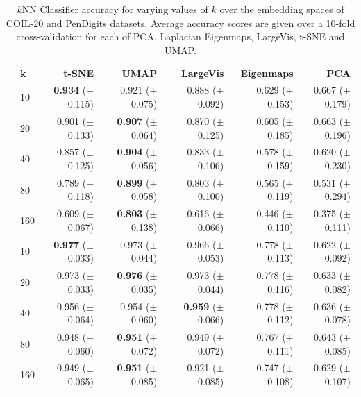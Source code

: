 \documentclass[12pt]{article}
\begin{document}
\begin{table}[!hptb]
\centering
\begin{tabular}{ll|rrrrr}
\toprule
\textbf{} & \textbf{k} & \textbf{t-SNE} & \textbf{UMAP} & \textbf{LargeVis} & \textbf{Eigenmaps} & \textbf{PCA} \\
\cline{2-7}
\parbox[t]{2mm}{}
          & 10 & \textbf{0.934} {\tiny ($\pm$ 0.115)}  & 0.921 {\tiny ($\pm$ 0.075)} & 0.888  {\tiny ($\pm$ 0.092)}& 0.629 {\tiny ($\pm$ 0.153)} & 0.667  {\tiny ($\pm$ 0.179)}   \\
          & 20 & 0.901  {\tiny ($\pm$ 0.133)}  & \textbf{0.907} {\tiny ($\pm$ 0.064)} & 0.870 {\tiny ($\pm$ 0.125)} & 0.605 {\tiny ($\pm$ 0.185)} & 0.663  {\tiny ($\pm$ 0.196)}   \\
          & 40 & 0.857  {\tiny ($\pm$ 0.125)}  & \textbf{0.904} {\tiny ($\pm$ 0.056)} & 0.833 {\tiny ($\pm$ 0.106)} & 0.578 {\tiny ($\pm$ 0.159)} & 0.620  {\tiny ($\pm$ 0.230)}   \\
          & 80 & 0.789  {\tiny ($\pm$ 0.118)}  & \textbf{0.899} {\tiny ($\pm$ 0.058)} & 0.803 {\tiny ($\pm$ 0.100)} & 0.565 {\tiny ($\pm$ 0.119)} & 0.531  {\tiny ($\pm$ 0.294)}   \\
          & 160 & 0.609  {\tiny ($\pm$ 0.067)} & \textbf{0.803} {\tiny ($\pm$ 0.138)} & 0.616 {\tiny ($\pm$ 0.066)} & 0.446 {\tiny ($\pm$ 0.110)} & 0.375 {\tiny ($\pm$ 0.111)}    \\
\parbox[t]{2mm}{}
    & 10	& \textbf{0.977}	{\tiny ($\pm$ 0.033)}& 0.973 {\tiny ($\pm$ 0.044)}	& 0.966	{\tiny ($\pm$ 0.053)}&  0.778	{\tiny ($\pm$ 0.113)}& 0.622 {\tiny ($\pm$ 0.092)} \\
    & 20	& 0.973	{\tiny ($\pm$ 0.033)}& \textbf{0.976} {\tiny ($\pm$ 0.035)}	& 0.973	{\tiny ($\pm$ 0.044)}&  0.778	{\tiny ($\pm$ 0.116)}& 0.633 {\tiny ($\pm$ 0.082)} \\
    & 40	& 0.956	{\tiny ($\pm$ 0.064)}& 0.954 {\tiny ($\pm$ 0.060)}  & \textbf{0.959}	{\tiny ($\pm$ 0.066)}&  0.778	{\tiny ($\pm$ 0.112)}& 0.636 {\tiny ($\pm$ 0.078)} \\
    & 80	& 0.948	{\tiny ($\pm$ 0.060)}& \textbf{0.951} {\tiny ($\pm$ 0.072)}  & 0.949	{\tiny ($\pm$ 0.072)}&  0.767	{\tiny ($\pm$ 0.111)}& 0.643 {\tiny ($\pm$ 0.085)} \\
    & 160	& 0.949	{\tiny ($\pm$ 0.065)}& \textbf{0.951} {\tiny ($\pm$ 0.085)}	& 0.921	{\tiny ($\pm$ 0.085)}&  0.747	{\tiny ($\pm$ 0.108)}& 0.629 {\tiny ($\pm$ 0.107)} \\
\bottomrule
\end{tabular}
\caption{$k$NN Classifier accuracy for varying values of $k$ over the embedding spaces of COIL-20
    and PenDigits datasets. Average accuracy scores are given over a 10-fold cross-validation for
    each of PCA, Laplacian Eigenmaps, LargeVis, t-SNE and UMAP.}\label{table:small-data-accuracy}
\end{table}
\end{document}
